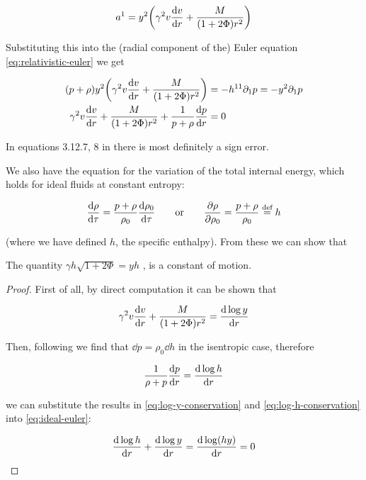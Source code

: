 \documentclass[main.tex]{subfiles}
\begin{document}
\begin{equation}
  a^1 = y^2 \qty(\gamma^2 v \dv{v}{r} + \frac{M}{(1+ 2 \Phi) r^2})
\end{equation}

Substituting this into the (radial component of the) Euler equation \eqref{eq:relativistic-euler} we get

\begin{subequations}
\begin{align}
  (p + \rho) y^2 \qty(\gamma^2 v \dv{v}{r} + \frac{M}{(1+ 2 \Phi) r^2}) &= - h^{1 1} \partial_1 p = - y^2 \partial_1 p \\
   \gamma^2 v \dv{v}{r} + \frac{M}{(1+ 2 \Phi) r^2} + \frac{1}{p + \rho} \dv{p}{r} &= 0
  \label{eq:ideal-euler}
\end{align}
\end{subequations}

\begin{greenbox}
  In equations 3.12.7, 8 in \cite{Nobili:2000} there is most definitely a sign error.
\end{greenbox}

We also have the equation for the variation of the total internal energy, which holds for ideal fluids at constant entropy:

\begin{equation} \label{eq:enthalpy-definition}
    \dv{\rho}{\tau} = \frac{p+\rho}{\rho_0} \dv{\rho_0}{\tau}
    \qquad
    \text{or}
    \qquad
    \pdv{\rho}{\rho_0} = \frac{p + \rho}{\rho_0} \defeq h
\end{equation}

(where we have defined $h$, the specific enthalpy).
From these we can show that

\begin{claim}
The quantity $\gamma h \sqrt{1+2\Phi} = yh$ , is a constant of motion.
\end{claim}

\begin{proof}
First of all, by direct computation it can be shown that

\begin{equation} \label{eq:log-y-conservation}
  \gamma^2 v \dv{v}{r} + \frac{M}{(1+ 2 \Phi) r^2} = \dv{\log y }{r}
\end{equation}

Then, following \textcite[section 6.3]{Gourgoulhon:2006bn} we find that \(\dd{p} = \rho_0 \dd{h}\) in the isentropic case, therefore

\begin{equation} \label{eq:log-h-conservation}
  \frac{1}{\rho + p} \dv{p}{r}  =  \dv{\log h}{r}
\end{equation}

we can substitute the results in \eqref{eq:log-y-conservation} and \eqref{eq:log-h-conservation} into \eqref{eq:ideal-euler}:

\begin{equation}
  \dv{\log h}{r} + \dv{\log y }{r} = \dv{\log (hy) }{r} = 0
\end{equation}

\end{proof}
\end{document}
